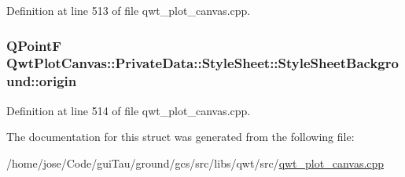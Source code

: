 Definition at line 513 of file qwt\-\_\-plot\-\_\-canvas.\-cpp.

\hypertarget{struct_qwt_plot_canvas_1_1_private_data_1_1_style_sheet_1_1_style_sheet_background_a7c79042a0846278ff1923d67b82ae2dd}{
\subsubsection[{origin}]{\setlength{\rightskip}{0pt plus 5cm}Q\-Point\-F Qwt\-Plot\-Canvas\-::\-Private\-Data\-::\-Style\-Sheet\-::\-Style\-Sheet\-Background\-::origin}}\label{struct_qwt_plot_canvas_1_1_private_data_1_1_style_sheet_1_1_style_sheet_background_a7c79042a0846278ff1923d67b82ae2dd}


Definition at line 514 of file qwt\-\_\-plot\-\_\-canvas.\-cpp.



The documentation for this struct was generated from the following file\-:\begin{DoxyCompactItemize}
\item 
/home/jose/\-Code/gui\-Tau/ground/gcs/src/libs/qwt/src/\hyperlink{qwt__plot__canvas_8cpp}{qwt\-\_\-plot\-\_\-canvas.\-cpp}\end{DoxyCompactItemize}
